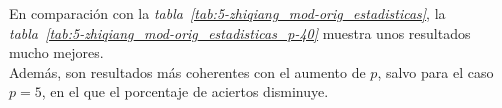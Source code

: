 En comparación con la \textit{tabla~\ref{tab:5-zhiqiang_mod-orig_estadisticas}}, la \textit{tabla~\ref{tab:5-zhiqiang_mod-orig_estadisticas_p-40}} muestra unos resultados mucho mejores.
\\
Además, son resultados más coherentes con el aumento de $p$, salvo para el caso $p = 5$, en el que el porcentaje de aciertos disminuye.


